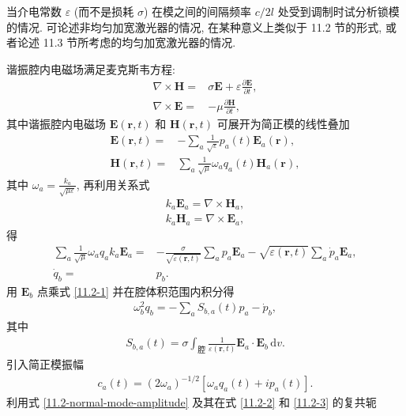 \documentclass{note}
\begin{document}
\begin{exe}
    当介电常数 $\varepsilon$ (而不是损耗 $\sigma$) 在模之间的间隔频率 $c/2l$ 处受到调制时试分析锁模的情况. 可论述非均匀加宽激光器的情况, 在某种意义上类似于 11.2 节的形式, 或者论述 11.3 节所考虑的均匀加宽激光器的情况.
\end{exe}
\begin{sol}
    谐振腔内电磁场满足麦克斯韦方程:
    \begin{align}
        \nabla\times\bm{H}=&\sigma \bm{E}+\varepsilon\frac{\partial\bm{E}}{\partial t},\\
        \nabla\times\bm{E}=&-\mu\frac{\partial\bm{H}}{\partial t},
    \end{align}
    其中谐振腔内电磁场 $\bm{E}(\bm{r},t)$ 和 $\bm{H}(\bm{r},t)$ 可展开为简正模的线性叠加
    \begin{align}
        \bm{E}(\bm{r},t)=&-\sum_a\frac{1}{\sqrt{\varepsilon}}p_a(t)\bm{E}_a(\bm{r}),\\
        \bm{H}(\bm{r},t)=&\sum_a\frac{1}{\sqrt{\mu}}\omega_aq_a(t)\bm{H}_a(\bm{r}),
    \end{align}
    其中 $\omega_a=\frac{k_a}{\sqrt{\mu\varepsilon}}$,
    再利用关系式
    \begin{align}
        k_a\bm{E}_a=\nabla\times\bm{H}_a,\\
        k_a\bm{H}_a=\nabla\times\bm{E}_a,
    \end{align}
    得
    \begin{align}
        \label{11.2-1}
        \sum_a\frac{1}{\sqrt{\mu}}\omega_aq_ak_a\bm{E}_a=&-\frac{\sigma}{\sqrt{\varepsilon(\bm{r},t)}}\sum_ap_a\bm{E}_a-\sqrt{\varepsilon(\bm{r},t)}\sum_a\dot{p}_a\bm{E}_a,\\
        \label{11.2-2}
        \dot{q}_b=&p_b.
    \end{align}
    用 $\bm{E}_b$ 点乘式 \eqref{11.2-1} 并在腔体积范围内积分得
    \begin{align}
        \label{11.2-3}
        \omega_b^2q_b=-\sum_aS_{b,a}(t)p_a-\dot{p}_b,
    \end{align}
    其中
    \begin{align}
        \label{11.2-4}
        S_{b,a}(t)=\sigma\int_{\text{腔}}\frac{1}{\varepsilon(\bm{r},t)}\bm{E}_a\cdot\bm{E}_b\,\mathrm{d}v.
    \end{align}
    引入简正模振幅
    \begin{align}
        \label{11.2-normal-mode-amplitude}
        c_a(t)=(2\omega_a)^{-1/2}[\omega_aq_a(t)+ip_a(t)].
    \end{align}
    利用式 \eqref{11.2-normal-mode-amplitude} 及其在式 \eqref{11.2-2} 和 \eqref{11.2-3} 的复共轭

\end{sol}
\end{document}
